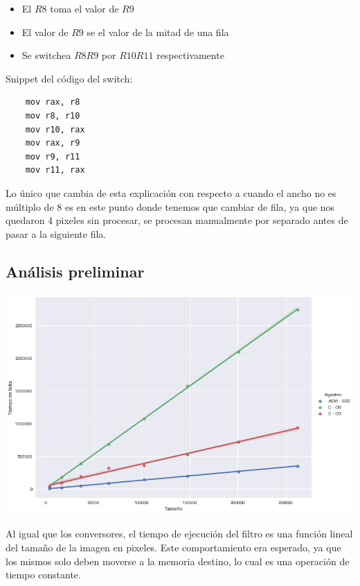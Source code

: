 \begin{itemize}

\item El $R8$ toma el valor de $R9$

\item El valor de $R9$ se el valor de la mitad de una fila 

\item Se switchea $R8 R9$ por $R10 R11$ respectivamente
\end{itemize}

Snippet del código del switch:

\begin{lstlisting}
	mov rax, r8
	mov r8, r10
	mov r10, rax
	mov rax, r9
	mov r9, r11
	mov r11, rax
\end{lstlisting}

Lo único que cambia de esta explicación con respecto a cuando el ancho no es múltiplo de 8 es en este punto donde tenemos que cambiar de fila, ya que nos quedaron 4 pixeles sin procesar, se procesan manualmente por separado antes de pasar a la siguiente fila.

\subsection{Análisis preliminar}

\begin{center}
	\includegraphics[scale=0.5]{img/fourCombine_CvsASMvsO3.png}
\end{center}

Al igual que los conversores, el tiempo de ejecución del filtro es una función lineal del tamaño de la imagen en pixeles. Este comportamiento era esperado, ya que los mismos solo deben moverse a la memoria destino, lo cual es una operación de tiempo constante.


